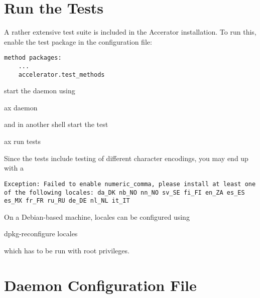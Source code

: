 \section{Run the Tests}
A rather extensive test suite is included in the Accerator
installation.  To run this, enable the test package in the
configuration file:
\begin{verbatim}
method packages:
    ...
    accelerator.test_methods
\end{verbatim}
start the daemon using
\begin{python}
  ax daemon
\end{python}
and in another shell start the test
\begin{python}
ax run tests
\end{python}
Since the tests include testing of different character encodings, you may end up with a
\begin{verbatim}
Exception: Failed to enable numeric_comma, please install at least one
of the following locales: da_DK nb_NO nn_NO sv_SE fi_FI en_ZA es_ES
es_MX fr_FR ru_RU de_DE nl_NL it_IT
\end{verbatim}
On a Debian-based machine, locales can be configured using
\begin{shell}
dpkg-reconfigure locales 
\end{shell}
which has to be run with root privileges.




\section{Daemon Configuration File}
\label{sec:configfile}

